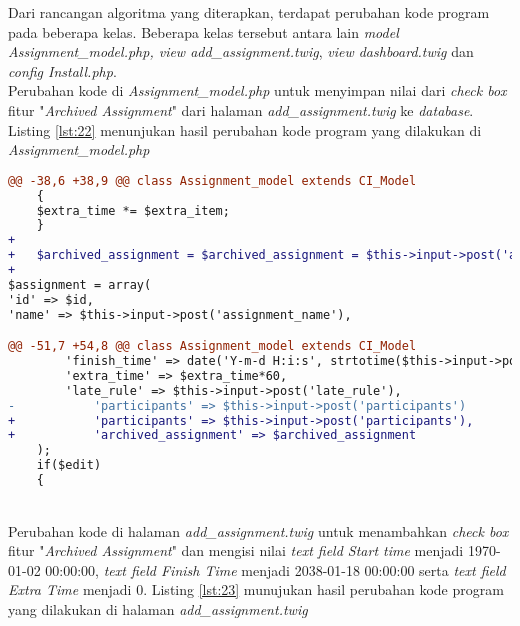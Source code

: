 Dari rancangan algoritma yang diterapkan, terdapat perubahan kode program pada beberapa kelas. Beberapa kelas tersebut antara lain \textit{model Assignment\_model.php, view add\_assignment.twig}, \textit{view dashboard.twig} dan \textit{config Install.php}.
~\\
Perubahan kode di \textit{Assignment\_model.php} untuk menyimpan nilai dari \textit{check box} fitur "\textit{Archived Assignment}" dari halaman \textit{add\_assignment.twig} ke \textit{database}. Listing \ref{lst:22} menunjukan hasil perubahan kode program yang dilakukan di \textit{Assignment\_model.php}

\begin{lstlisting}[language=diff, caption=Perubahan kode program pada \textit{Assignments\_model.php}, label=lst:22, basicstyle=\ttfamily, frame=single,
columns=fullflexible, keepspaces=true, breaklines=true]
@@ -38,6 +38,9 @@ class Assignment_model extends CI_Model
	{
	$extra_time *= $extra_item;
	}
+  
+   $archived_assignment = $archived_assignment = $this->input->post('archived_assignment')!==NULL ? 1 : 0;
+  
$assignment = array(
'id' => $id,
'name' => $this->input->post('assignment_name'),

@@ -51,7 +54,8 @@ class Assignment_model extends CI_Model
		'finish_time' => date('Y-m-d H:i:s', strtotime($this->input->post('finish_time'))),
		'extra_time' => $extra_time*60,
		'late_rule' => $this->input->post('late_rule'),
-       	'participants' => $this->input->post('participants')
+           'participants' => $this->input->post('participants'),
+           'archived_assignment' => $archived_assignment
	);
	if($edit)
	{
\end{lstlisting}
~\\
Perubahan kode di halaman \textit{add\_assignment.twig} untuk menambahkan \textit{check box} fitur "\textit{Archived Assignment}" dan  mengisi nilai \textit{text field Start time} menjadi 1970-01-02 00:00:00, \textit{text field Finish Time} menjadi 2038-01-18 00:00:00 serta \textit{text field Extra Time} menjadi 0. Listing \ref{lst:23} munujukan hasil perubahan kode program yang dilakukan di halaman \textit{add\_assignment.twig}

